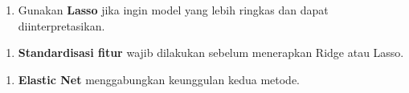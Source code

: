 \documentclass[12pt,a4paper]{article}
\begin{document}
\begin{enumerate}
\item Gunakan \textbf{Lasso} jika ingin model yang lebih ringkas dan dapat diinterpretasikan.
\end{enumerate}

\begin{enumerate}
\item \textbf{Standardisasi fitur} wajib dilakukan sebelum menerapkan Ridge atau Lasso.
\end{enumerate}

\begin{enumerate}
\item \textbf{Elastic Net} menggabungkan keunggulan kedua metode.
\end{enumerate}
\end{document}
